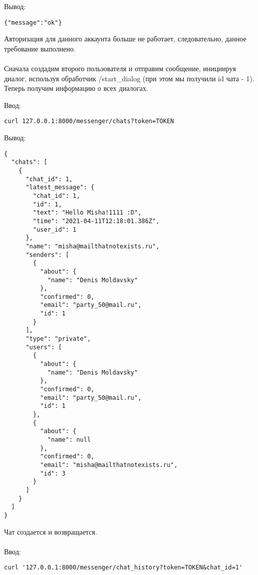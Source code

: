 \documentclass[testmethods]{espd}
\begin{document}
Вывод:

\begin{verbatim}
{"message":"ok"}
\end{verbatim}

Авторизация для данного аккаунта больше не работает, следовательно, данное требование выполнено.

\paragraph{} %
Сначала создадим второго пользователя и отправим сообщение, инициируя диалог, используя обработчик /start\_dialog (при этом мы получили id чата - 1). Теперь получим информацию о всех диалогах.

Ввод:

\begin{verbatim}
curl 127.0.0.1:8000/messenger/chats?token=TOKEN
\end{verbatim}

Вывод:

\begin{verbatim}
{
  "chats": [
    {
      "chat_id": 1,
      "latest_message": {
        "chat_id": 1,
        "id": 1,
        "text": "Hello Misha!1111 :D",
        "time": "2021-04-11T12:18:01.386Z",
        "user_id": 1
      },
      "name": "misha@mailthatnotexists.ru",
      "senders": [
        {
          "about": {
            "name": "Denis Moldavsky"
          },
          "confirmed": 0,
          "email": "party_50@mail.ru",
          "id": 1
        }
      ],
      "type": "private",
      "users": [
        {
          "about": {
            "name": "Denis Moldavsky"
          },
          "confirmed": 0,
          "email": "party_50@mail.ru",
          "id": 1
        },
        {
          "about": {
            "name": null
          },
          "confirmed": 0,
          "email": "misha@mailthatnotexists.ru",
          "id": 3
        }
      ]
    }
  ]
}
\end{verbatim}

 Чат создается и возвращается.

\paragraph{} %
Ввод:

\begin{verbatim}
curl '127.0.0.1:8000/messenger/chat_history?token=TOKEN&chat_id=1'
\end{verbatim}
\end{document}
